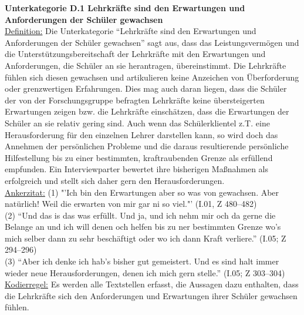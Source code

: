 \noindent
\textbf{Unterkategorie D.1 Lehrkräfte sind den Erwartungen und Anforderungen der Schüler gewachsen}\\
\underline{Definition:} Die Unterkategorie "`Lehrkräfte sind den Erwartungen und Anforderungen der Schüler gewachsen"' sagt aus, dass das Leistungsvermögen und die Unterstützungsbereitschaft der Lehrkräfte mit den Erwartungen und Anforderungen, die Schüler an sie herantragen, übereinstimmt. Die Lehrkräfte fühlen sich diesen gewachsen und artikulieren keine Anzeichen von Überforderung oder grenzwertigen Erfahrungen. Dies mag auch daran liegen, dass die Schüler der von der Forschungsgruppe befragten Lehrkräfte keine übersteigerten Erwartungen zeigen bzw. die Lehrkräfte einschätzen, dass die Erwartungen der Schüler an sie relativ gering sind. Auch wenn das Schülerklientel z.T. eine Herausforderung für den einzelnen Lehrer darstellen kann, so wird doch das Annehmen der persönlichen Probleme und die daraus resultierende persönliche Hilfestellung bis zu einer bestimmten, kraftraubenden Grenze als erfüllend empfunden. Ein Interviewparter bewertet ihre bisherigen Maßnahmen als erfolgreich und stellt sich daher gern den Herausforderungen.\\
\underline{Ankerzitat:} (1) "'Ich bin den Erwartungen aber so was von gewachsen. Aber natürlich! Weil die erwarten von mir gar ni so viel."' (I.01, Z 480--482)\\ (2) "`Und das is das was erfüllt. Und ja, und ich nehm mir och da gerne die Belange an und ich will denen och helfen bis zu ner bestimmten Grenze wo's mich selber dann zu sehr beschäftigt oder wo ich dann Kraft verliere."' (I.05; Z 294--296)\\ (3) "`Aber ich denke ich hab's bisher gut gemeistert. Und es sind halt immer wieder neue Herausforderungen, denen ich mich gern stelle."' (I.05; Z 303--304)\\
\underline{Kodierregel:} Es werden alle Textstellen erfasst, die Aussagen dazu enthalten, dass die Lehrkräfte sich den Anforderungen und Erwartungen ihrer Schüler gewachsen fühlen. \\

